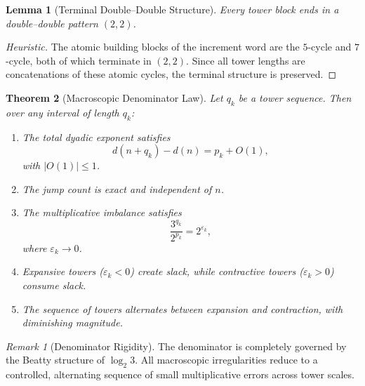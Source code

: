 \documentclass[12pt, oneside]{article}
\numberwithin{equation}{section}
\theoremstyle{definition}
\theoremstyle{plain}
\newtheorem{theorem}{Theorem}[section]
\newtheorem{lemma}[theorem]{Lemma}
\theoremstyle{remark}
\newtheorem*{remark}{Remark}
\begin{document}

\begin{lemma}[Terminal Double--Double Structure]
\label{lem:dd-terminal}
Every tower block ends in a double--double pattern $(2,2)$.
\end{lemma}

\begin{proof}[Heuristic]
The atomic building blocks of the increment word are the $5$-cycle and
$7$-cycle, both of which terminate in $(2,2)$.  Since all tower lengths
are concatenations of these atomic cycles, the terminal structure is
preserved.
\end{proof}


\begin{theorem}[Macroscopic Denominator Law]
\label{thm:denominator-law}
Let $q_k$ be a tower sequence.  Then over any interval of length $q_k$:
\begin{enumerate}
\item The total dyadic exponent satisfies
\[
d(n+q_k)-d(n) = p_k + O(1),
\]
with $|O(1)| \le 1$.

\item The jump count is exact and independent of $n$.

\item The multiplicative imbalance satisfies
\[
\frac{3^{q_k}}{2^{p_k}} = 2^{\varepsilon_k},
\]
where $\varepsilon_k \to 0$.

\item Expansive towers ($\varepsilon_k<0$) create slack, while
contractive towers ($\varepsilon_k>0$) consume slack.

\item The sequence of towers alternates between expansion and contraction,
with diminishing magnitude.
\end{enumerate}
\end{theorem}


\begin{remark}[Denominator Rigidity]
The denominator is completely governed by the Beatty structure of
$\log_2 3$.  All macroscopic irregularities reduce to a controlled,
alternating sequence of small multiplicative errors across tower scales.
\end{remark}

\end{document}

